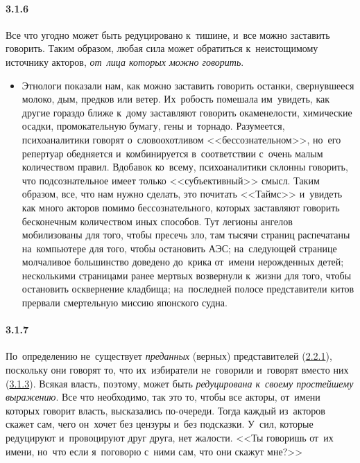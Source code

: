 \paragraph{3.1.6}\hypertarget{par:3.1.6}{} Все что угодно может быть редуцировано к~тишине, и~все можно заставить говорить. Таким образом, любая сила может обратиться к~неистощимому источнику акторов, {\itshape от~лица которых можно говорить}.
	\begin{itemize}
	\item 
	Этнологи показали нам, как можно заставить говорить останки, свернувшееся молоко, дым, предков или ветер. Их~робость помешала им~увидеть, как другие гораздо ближе к~дому заставляют говорить окаменелости, химические осадки, промокательную бумагу, гены и~торнадо. Разумеется, психоаналитики говорят о~словоохотливом <<бессознательном>>, но~его репертуар обедняется и~комбинируется в~соответствии с~очень малым количеством правил. Вдобавок ко~всему, психоаналитики склонны говорить, что подсознательное имеет только <<субъективный>> смысл. Таким образом, все, что нам нужно сделать, это почитать <<Таймс>> и~увидеть как много акторов помимо бессознательного, которых заставляют говорить бесконечным количеством иных способов. Тут легионы ангелов мобилизованы для того, чтобы пресечь зло, там тысячи страниц распечатаны на~компьютере для того, чтобы остановить АЭС; на~следующей странице молчаливое большинство доведено до~крика от~имени нерожденных детей; несколькими страницами ранее мертвых возвернули к~жизни для того, чтобы остановить осквернение кладбища; на~последней полосе представители китов прервали смертельную миссию японского судна.
	\end{itemize}

\paragraph{3.1.7}\hypertarget{par:3.1.7}{} По~определению не~существует {\itshape преданных} (верных) представителей (\hyperlink{par:2.2.1}{2.2.1}), поскольку они говорят то, что их~избиратели не~говорили и~говорят вместо них (\hyperlink{par:3.1.3}{3.1.3}). Всякая власть, поэтому, может быть {\itshape редуцирована к~своему простейшему выражению}. Все что необходимо, так это то, чтобы все акторы, от~имени которых говорит власть, высказались по-очереди. Тогда каждый из~акторов скажет сам, чего он~хочет без цензуры и~без подсказки. У~сил, которые редуцируют и~провоцируют друг друга, нет жалости. <<Ты говоришь от~их имени, но~что если я~поговорю с~ними сам, что они скажут мне?>>

